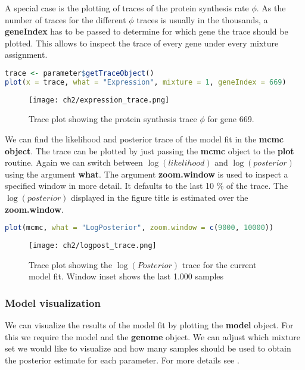 A special case is the plotting of traces of the protein synthesis rate $\phi$. 
As the number of traces for the different $\phi$ traces is usually in the thousands, a \textbf{geneIndex} has to be passed to determine for which gene the trace should be plotted. 
This allows to inspect the trace of every gene under every mixture assignment.

\begin{lstlisting}[language=R]
trace <- parameter$getTraceObject()
plot(x = trace, what = "Expression", mixture = 1, geneIndex = 669)
\end{lstlisting}

\begin{figure}[h]
  \centering
  \texttt{[image: ch2/expression\_trace.png]}\\
  \caption{Trace plot showing the protein synthesis trace $\phi$ for gene 669.}
  \label{fig:logphi_trace}
\end{figure} 

We can find the likelihood and posterior trace of the model fit in the \textbf{mcmc object}. 
The trace can be plotted by just passing the \textbf{mcmc} object to the \textbf{plot} routine. 
Again we can switch between $\log(likelihood)$ and $\log(posterior)$ using the argument \textbf{what}. 
The argument \textbf{zoom.window} is used to inspect a specified window in more detail. 
It defaults to the last 10 \% of the trace. 
The $\log(posterior)$ displayed in the figure title is estimated over the \textbf{zoom.window}.

\begin{lstlisting}[language=R]
plot(mcmc, what = "LogPosterior", zoom.window = c(9000, 10000))
\end{lstlisting}


\begin{figure}[h]
  \centering
  \texttt{[image: ch2/logpost\_trace.png]}\\
  \caption{Trace plot showing the $\log(Posterior)$ trace for the current model fit. Window inset shows the last 1.000 samples}
  \label{fig:logpost_trace}
\end{figure} 

\subsubsection{Model visualization}
We can visualize the results of the model fit by plotting the \textbf{model} object. 
For this we require the model and the \textbf{genome} object. 
We can adjust which mixture set we would like to visualize and how many samples should be used to obtain the posterior estimate for each parameter. 
For more details see \citet{gilchrist2015}.

